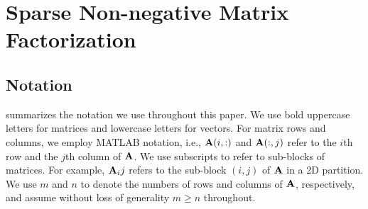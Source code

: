 
\section{Sparse Non-negative Matrix Factorization}
\label{sec:sparsenmf}


\subsection{Notation}
\label{sec:notations}

 summarizes the notation we use throughout this paper.
We use bold uppercase letters for matrices and lowercase letters for vectors.
For matrix rows and columns, we employ MATLAB notation, i.e., $\AA(i, :)$ and $\AA(:, j)$ refer to the $i$th row and the $j$th column of $\AA$.
We use subscripts to refer to sub-blocks of matrices.
For example, $\AA_ij$ refers to the sub-block $(i, j)$ of $\AA$ in a 2D partition.
We use $m$ and $n$ to denote the numbers of rows and columns of $\AA$, respectively, and assume without loss of generality $m\geq n$ throughout.

